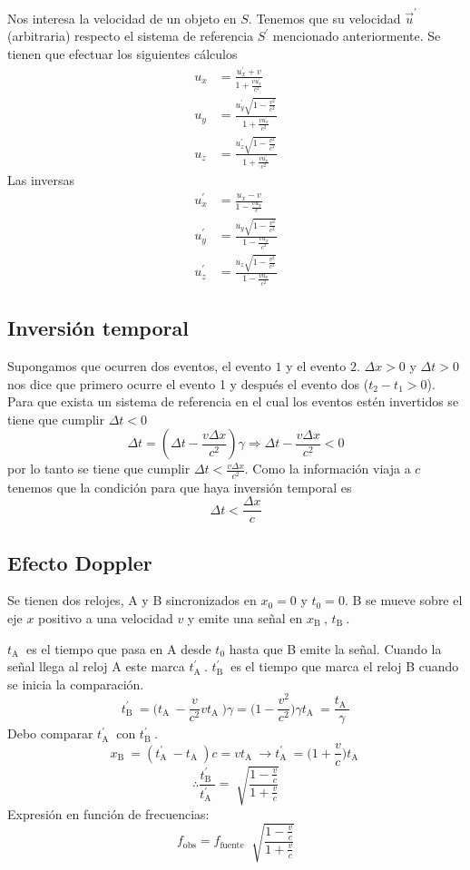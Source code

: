\documentclass[10pt,twocolumn,titlepage]{article}
\newcommand{\A}{\textrm{A }}
\newcommand{\B}{\textrm{B }}
\begin{document}
Nos interesa la velocidad de un objeto en $S$. Tenemos que su velocidad $\vec{u}^\prime$ (arbitraria) respecto el sistema de referencia $S^\prime$ mencionado anteriormente. Se tienen que efectuar los siguientes cálculos
\begin{align*}
u_x&=\frac{u^\prime_x+v}{1+\frac{vu^\prime_x}{c^2}}\\
u_y&=\frac{u_y^\prime \sqrt{1-\frac{v^2}{c^2}}}{1+\frac{vu^\prime_x}{c^2}} \\
u_z&=\frac{u_z^\prime \sqrt{1-\frac{v^2}{c^2}}}{1+\frac{vu^\prime_x}{c^2}} 
\end{align*}
Las inversas
\begin{align*}
u^\prime_x&=\frac{u_x-v}{1-\frac{vu_x}{c}}\\
u^\prime_y&=\frac{u_y\sqrt{1-\frac{v^2}{c^2}}}{1-\frac{vu_x}{c^2}}\\
u^\prime_z&=\frac{u_z\sqrt{1-\frac{v^2}{c^2}}}{1-\frac{vu_x}{c^2}}
\end{align*}

\subsection{Inversión temporal}
Supongamos que ocurren dos eventos, el evento $1$ y el evento $2$. $\Delta x>0$ y $\Delta t>0$ nos dice que primero ocurre el evento 1 y después el evento dos ($t_2-t_1>0$). Para que exista un sistema de referencia en el cual los eventos estén invertidos se tiene que cumplir $\Delta t<0$
$$\Delta t=\left(\Delta t-\frac{v\Delta x}{c^2}\right)\gamma\Rightarrow\Delta t-\frac{v\Delta x}{c^2}<0 $$
por lo tanto se tiene que cumplir $\Delta t<\frac{v\Delta x}{c^2}$. Como la información viaja a $c$ tenemos que la condición para que haya inversión temporal es
$$\Delta t < \frac{\Delta x}{c} $$

\subsection{Efecto Doppler}
Se tienen dos relojes, \A y \B sincronizados en $x_0=0$ y $t_0=0$. \B se mueve sobre el eje $x$ positivo a una velocidad $v$ y emite una señal en $x_\B$, $t_\B$.\par 
$t_\A$ es el tiempo que pasa en \A desde $t_0$ hasta que \B emite la señal. Cuando la señal llega al reloj \A este marca $t_\A^\prime$.   $t_\B^\prime$ es el tiempo que marca el reloj \B cuando se inicia la comparación.
$$t_\B^\prime=\bigg( t_\A -\frac{v}{c^2}vt_\A\bigg) \gamma =\bigg( 1-\frac{v^2}{c^2}\bigg)\gamma t_\A= \frac{t_\A}{\gamma} $$
Debo comparar $t_\A^\prime$ con $t_\B^\prime$.
$$x_\B =(t_\A^\prime  -t_\A )c=vt_\A\rightarrow t_\A^\prime=\bigg( 1+\frac{v}{c}\bigg) t_\A$$
$$\therefore \frac{t_\B^\prime}{t_\A^\prime}=\sqrt[]{\frac{1-\frac{v}{c}}{1+\frac{v}{c}}} $$
Expresión en función de frecuencias:
$$f_\textrm{obs}=f_\textrm{fuente} \;\sqrt[]{\frac{1-\frac{v}{c}}{1+\frac{v}{c}}} $$
\end{document}

